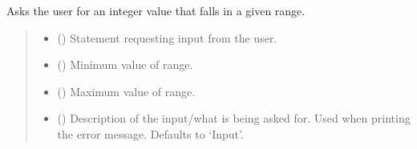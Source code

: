 \documentclass[letterpaper,10pt,english]{sphinxmanual}
\begin{document}
\begin{fulllineitems}

\begin{fulllineitems}
\label{\detokenize{Setup.Inputs:Setup.Inputs.GetUserInput.UserInput.AskForIntInRange}}
\pysigstartsignatures
{}
\pysigstopsignatures
\sphinxAtStartPar
Asks the user for an integer value that falls in a given range.
\begin{quote}\begin{description}
\begin{itemize}
\item {} 
\sphinxAtStartPar
{} () \textendash{} Statement requesting input from the user.

\item {} 
\sphinxAtStartPar
{} () \textendash{} Minimum value of range.

\item {} 
\sphinxAtStartPar
{} () \textendash{} Maximum value of range.

\item {} 
\sphinxAtStartPar
{} (\sphinxstyleliteralemphasis{\sphinxupquote{, }}) \textendash{} Description of the input/what is being asked for. Used when printing                 the error message. Defaults to ‘Input’.


\end{itemize}
\end{description}
\end{quote}
\end{fulllineitems}
\end{fulllineitems}
\end{document}
